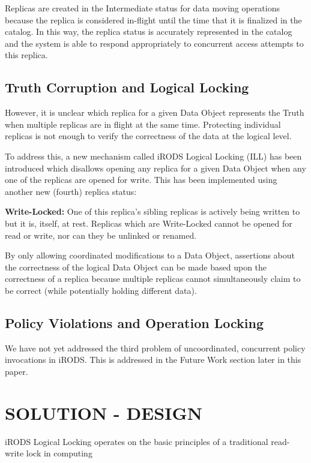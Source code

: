 \documentclass{irodsugm}
\begin{document}
Replicas are created in the Intermediate status for data moving operations because the replica is considered in-flight until the time that it is finalized in the catalog. In this way, the replica status is accurately represented in the catalog and the system is able to respond appropriately to concurrent access attempts to this replica.

\subsection*{Truth Corruption and Logical Locking}

However, it is unclear which replica for a given Data Object represents the Truth when multiple replicas are in flight at the same time. Protecting individual replicas is not enough to verify the correctness of the data at the logical level.

To address this, a new mechanism called iRODS Logical Locking (ILL) has been introduced which disallows opening any replica for a given Data Object when any one of the replicas are opened for write. This has been implemented using another new (fourth) replica status:

\textbf{Write-Locked:} One of this replica's sibling replicas is actively being written to but it is, itself, at rest. Replicas which are Write-Locked cannot be opened for read or write, nor can they be unlinked or renamed.

By only allowing coordinated modifications to a Data Object, assertions about the correctness of the logical Data Object can be made based upon the correctness of a replica because multiple replicas cannot simultaneously claim to be correct (while potentially holding different data).

\subsection*{Policy Violations and Operation Locking}

We have not yet addressed the third problem of uncoordinated, concurrent policy invocations in iRODS.  This is addressed in the Future Work section later in this paper.

\section*{SOLUTION - DESIGN}

iRODS Logical Locking operates on the basic principles of a traditional read-write lock in computing\cite{readerswriterlock}
\end{document}

